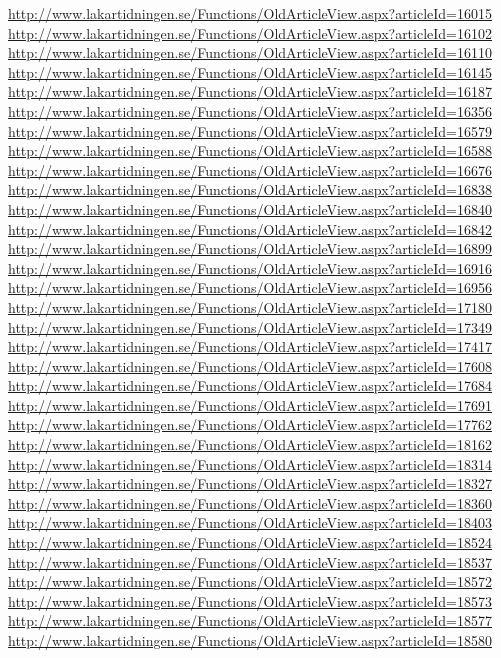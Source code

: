 \documentclass[a4paper]{report}
\begin{document}
\begin{appendices}
\begin{footnotesize}
\url{http://www.lakartidningen.se/Functions/OldArticleView.aspx?articleId=16015}
\url{http://www.lakartidningen.se/Functions/OldArticleView.aspx?articleId=16102}
\url{http://www.lakartidningen.se/Functions/OldArticleView.aspx?articleId=16110}
\url{http://www.lakartidningen.se/Functions/OldArticleView.aspx?articleId=16145}
\url{http://www.lakartidningen.se/Functions/OldArticleView.aspx?articleId=16187}
\url{http://www.lakartidningen.se/Functions/OldArticleView.aspx?articleId=16356}
\url{http://www.lakartidningen.se/Functions/OldArticleView.aspx?articleId=16579}
\url{http://www.lakartidningen.se/Functions/OldArticleView.aspx?articleId=16588}
\url{http://www.lakartidningen.se/Functions/OldArticleView.aspx?articleId=16676}
\url{http://www.lakartidningen.se/Functions/OldArticleView.aspx?articleId=16838}
\url{http://www.lakartidningen.se/Functions/OldArticleView.aspx?articleId=16840}
\url{http://www.lakartidningen.se/Functions/OldArticleView.aspx?articleId=16842}
\url{http://www.lakartidningen.se/Functions/OldArticleView.aspx?articleId=16899}
\url{http://www.lakartidningen.se/Functions/OldArticleView.aspx?articleId=16916}
\url{http://www.lakartidningen.se/Functions/OldArticleView.aspx?articleId=16956}
\url{http://www.lakartidningen.se/Functions/OldArticleView.aspx?articleId=17180}
\url{http://www.lakartidningen.se/Functions/OldArticleView.aspx?articleId=17349}
\url{http://www.lakartidningen.se/Functions/OldArticleView.aspx?articleId=17417}
\url{http://www.lakartidningen.se/Functions/OldArticleView.aspx?articleId=17608}
\url{http://www.lakartidningen.se/Functions/OldArticleView.aspx?articleId=17684}
\url{http://www.lakartidningen.se/Functions/OldArticleView.aspx?articleId=17691}
\url{http://www.lakartidningen.se/Functions/OldArticleView.aspx?articleId=17762}
\url{http://www.lakartidningen.se/Functions/OldArticleView.aspx?articleId=18162}
\url{http://www.lakartidningen.se/Functions/OldArticleView.aspx?articleId=18314}
\url{http://www.lakartidningen.se/Functions/OldArticleView.aspx?articleId=18327}
\url{http://www.lakartidningen.se/Functions/OldArticleView.aspx?articleId=18360}
\url{http://www.lakartidningen.se/Functions/OldArticleView.aspx?articleId=18403}
\url{http://www.lakartidningen.se/Functions/OldArticleView.aspx?articleId=18524}
\url{http://www.lakartidningen.se/Functions/OldArticleView.aspx?articleId=18537}
\url{http://www.lakartidningen.se/Functions/OldArticleView.aspx?articleId=18572}
\url{http://www.lakartidningen.se/Functions/OldArticleView.aspx?articleId=18573}
\url{http://www.lakartidningen.se/Functions/OldArticleView.aspx?articleId=18577}
\url{http://www.lakartidningen.se/Functions/OldArticleView.aspx?articleId=18580}

\end{footnotesize}
\end{appendices}
\end{document}
